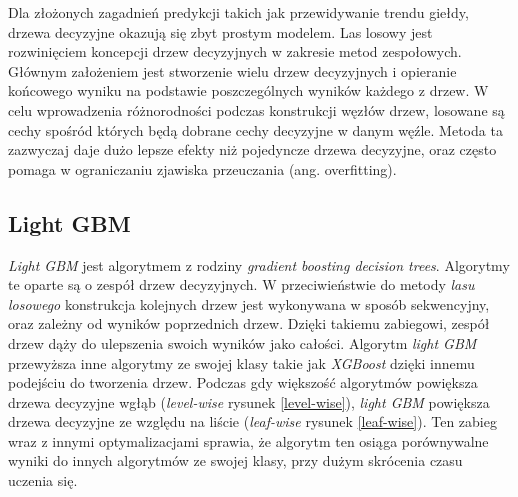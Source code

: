 \documentclass[a4paper, twoside, 11pt, openright]{article}
\begin{document}
Dla złożonych zagadnień predykcji takich jak przewidywanie trendu giełdy, drzewa decyzyjne okazują się zbyt prostym modelem. Las losowy jest rozwinięciem koncepcji drzew decyzyjnych w zakresie metod zespołowych. Głównym założeniem jest stworzenie wielu drzew decyzyjnych i opieranie końcowego wyniku na podstawie poszczególnych wyników każdego z drzew. W celu wprowadzenia różnorodności podczas konstrukcji węzłów drzew, losowane są cechy spośród których będą dobrane cechy decyzyjne w danym węźle. Metoda ta zazwyczaj daje dużo lepsze efekty niż pojedyncze drzewa decyzyjne, oraz często pomaga w ograniczaniu zjawiska przeuczania (ang. overfitting).  

\subsection{Light GBM \cite{lgbm}}

\textit{Light GBM} jest algorytmem z rodziny \textit{gradient boosting decision trees}. Algorytmy te oparte są o zespół drzew decyzyjnych. W przeciwieństwie do metody \textit{lasu losowego} konstrukcja kolejnych drzew jest wykonywana w sposób sekwencyjny, oraz zależny od wyników poprzednich drzew. Dzięki takiemu zabiegowi, zespół drzew dąży do ulepszenia swoich wyników jako całości. Algorytm \textit{light GBM} przewyższa inne algorytmy ze swojej klasy takie jak \textit{XGBoost} dzięki innemu podejściu do tworzenia drzew. Podczas gdy większość algorytmów powiększa drzewa decyzyjne wgłąb (\textit{level-wise}  rysunek \ref{level-wise}), \textit{light GBM} powiększa drzewa decyzyjne ze względu na liście (\textit{leaf-wise} rysunek \ref{leaf-wise}). Ten zabieg wraz z innymi optymalizacjami sprawia, że algorytm ten osiąga porównywalne wyniki do innych algorytmów ze swojej klasy, przy dużym skrócenia czasu uczenia się. 
\end{document}
